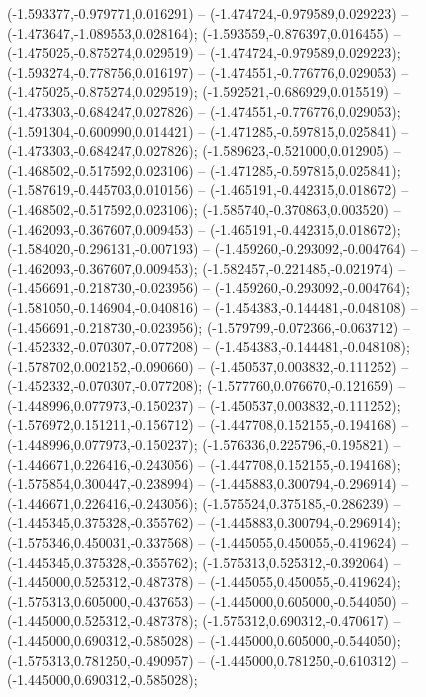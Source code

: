  (-1.593377,-0.979771,0.016291) -- (-1.474724,-0.979589,0.029223) -- (-1.473647,-1.089553,0.028164);
 (-1.593559,-0.876397,0.016455) -- (-1.475025,-0.875274,0.029519) -- (-1.474724,-0.979589,0.029223);
 (-1.593274,-0.778756,0.016197) -- (-1.474551,-0.776776,0.029053) -- (-1.475025,-0.875274,0.029519);
 (-1.592521,-0.686929,0.015519) -- (-1.473303,-0.684247,0.027826) -- (-1.474551,-0.776776,0.029053);
 (-1.591304,-0.600990,0.014421) -- (-1.471285,-0.597815,0.025841) -- (-1.473303,-0.684247,0.027826);
 (-1.589623,-0.521000,0.012905) -- (-1.468502,-0.517592,0.023106) -- (-1.471285,-0.597815,0.025841);
 (-1.587619,-0.445703,0.010156) -- (-1.465191,-0.442315,0.018672) -- (-1.468502,-0.517592,0.023106);
 (-1.585740,-0.370863,0.003520) -- (-1.462093,-0.367607,0.009453) -- (-1.465191,-0.442315,0.018672);
 (-1.584020,-0.296131,-0.007193) -- (-1.459260,-0.293092,-0.004764) -- (-1.462093,-0.367607,0.009453);
 (-1.582457,-0.221485,-0.021974) -- (-1.456691,-0.218730,-0.023956) -- (-1.459260,-0.293092,-0.004764);
 (-1.581050,-0.146904,-0.040816) -- (-1.454383,-0.144481,-0.048108) -- (-1.456691,-0.218730,-0.023956);
 (-1.579799,-0.072366,-0.063712) -- (-1.452332,-0.070307,-0.077208) -- (-1.454383,-0.144481,-0.048108);
 (-1.578702,0.002152,-0.090660) -- (-1.450537,0.003832,-0.111252) -- (-1.452332,-0.070307,-0.077208);
 (-1.577760,0.076670,-0.121659) -- (-1.448996,0.077973,-0.150237) -- (-1.450537,0.003832,-0.111252);
 (-1.576972,0.151211,-0.156712) -- (-1.447708,0.152155,-0.194168) -- (-1.448996,0.077973,-0.150237);
 (-1.576336,0.225796,-0.195821) -- (-1.446671,0.226416,-0.243056) -- (-1.447708,0.152155,-0.194168);
 (-1.575854,0.300447,-0.238994) -- (-1.445883,0.300794,-0.296914) -- (-1.446671,0.226416,-0.243056);
 (-1.575524,0.375185,-0.286239) -- (-1.445345,0.375328,-0.355762) -- (-1.445883,0.300794,-0.296914);
 (-1.575346,0.450031,-0.337568) -- (-1.445055,0.450055,-0.419624) -- (-1.445345,0.375328,-0.355762);
 (-1.575313,0.525312,-0.392064) -- (-1.445000,0.525312,-0.487378) -- (-1.445055,0.450055,-0.419624);
 (-1.575313,0.605000,-0.437653) -- (-1.445000,0.605000,-0.544050) -- (-1.445000,0.525312,-0.487378);
 (-1.575312,0.690312,-0.470617) -- (-1.445000,0.690312,-0.585028) -- (-1.445000,0.605000,-0.544050);
 (-1.575313,0.781250,-0.490957) -- (-1.445000,0.781250,-0.610312) -- (-1.445000,0.690312,-0.585028);
